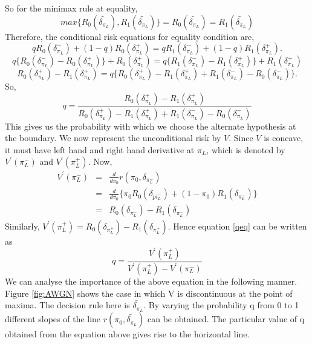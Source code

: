 \documentclass[a4paper,english,12pt]{article}
\begin{document}
So for the minimax rule at equality,
\begin{equation}
max\{ R_0(\tilde{\delta_{\pi_L}}), R_1(\tilde{\delta_{\pi_L}}) \} = R_0(\tilde{\delta_{\pi_L}}) = R_1(\tilde{\delta_{\pi_L}})
\end{equation}
Therefore, the conditional risk equations for equality condition are,
\begin{equation*}
qR_0(\delta_{\pi_L}^{-}) + (1-q)R_0(\delta_{\pi_L}^{+}) = qR_1(\delta_{\pi_L}^{-}) + (1-q)R_1(\delta_{\pi_L}^{+}).
\end{equation*}
\begin{equation*}
q\{R_0(\delta_{\pi_L}^{-}) - R_0(\delta_{\pi_L}^{+})\} + R_0(\delta_{\pi_L}^{+}) = q\{R_1(\delta_{\pi_L}^{-}) - R_1(\delta_{\pi_L}^{+})\} + R_1(\delta_{\pi_L}^{+})
\end{equation*}
\begin{equation}
R_0(\delta_{\pi_L}^{+}) - R_1(\delta_{\pi_L}^{+}) = q\{R_0(\delta_{\pi_L}^{+}) - R_1(\delta_{\pi_L}^{+}) + R_1(\delta_{\pi_L}^{-}) - R_0(\delta_{\pi_L}^{-})\}.
\end{equation}
So,
\begin{equation}
\label{qeq}
q = \frac{R_0(\delta_{\pi_L}^{+}) - R_1(\delta_{\pi_L}^{+})}{R_0(\delta_{\pi_L}^{+}) - R_1(\delta_{\pi_L}^{+}) + R_1(\delta_{\pi_L}^{-}) - R_0(\delta_{\pi_L}^{-})}
\end{equation}
This gives us the probability with which we choose the alternate hypothesis at the boundary. We now represent the unconditional risk by $V$. Since $V$ is concave, it must have left hand and right hand derivative at $\pi_L$, which is denoted by $V^{'}(\pi_L^{-})$ and $V^{'}(\pi_L^{+})$. Now,
\begin{eqnarray}
V^{'}(\pi_L^{-}) &=& \frac{d}{d \pi_0} r(\pi_0 , \delta_{\pi_L^{-}}) \nonumber \\
&=& \frac{d}{d\pi_0}\{\pi_0 R_0(\delta_{pi_L^{-}}) + (1-\pi_0)R_1(\delta_{\pi_L^{-}}) \} \nonumber \\
&=& R_0(\delta_{\pi_L^{-}}) - R_1(\delta_{\pi_L^{-}}) 
\end{eqnarray}
Similarly, $V^{'}(\pi_L^{+}) = R_0(\delta_{\pi_L^{+}}) - R_1(\delta_{\pi_L^{+}})$. Hence equation \ref{qeq} can be written as
\begin{equation}
q = \frac{V^{'}(\pi_L^{+})}{V^{'}(\pi_L^{+}) - V^{'}(\pi_L^{-})}
\end{equation}
We can analyse the importance of the above equation in the following manner. Figure \ref{fig:AWGN} shows the case in which  V is discontinuous at the point of maxima. The decision rule here is $\tilde{\delta_{\pi_L}}$. By varying the probability q from 0 to 1 different slopes of the line $r(\pi_0, \tilde{\delta_{\pi_L}})$ can be obtained. The particular value of q obtained from the equation above gives rise to the horizontal line.   
\end{document}
